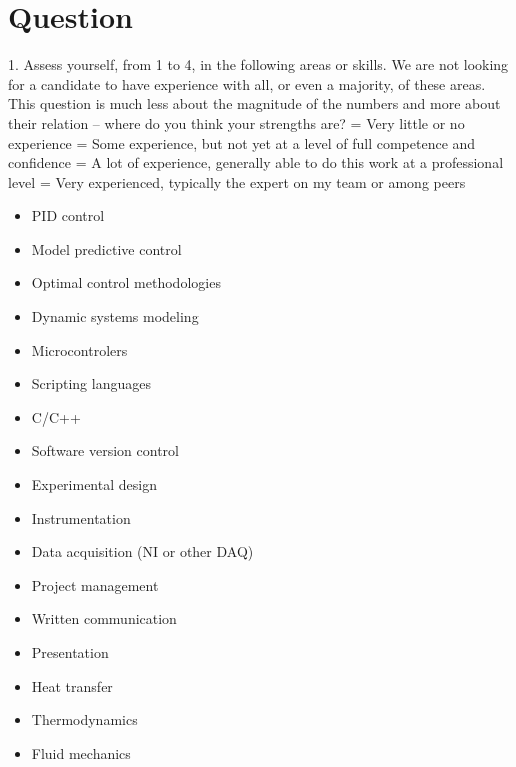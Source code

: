\section{Question}
1. Assess yourself, from 1 to 4, in the following areas or skills. We are not looking for a candidate to have experience with all, or even a majority, of these areas. This question is much less about the magnitude of the numbers and more about their relation – where do you think your strengths are?
\newline
{} = Very little or no experience
 = Some experience, but not yet at a level of full competence and confidence
 = A lot of experience, generally able to do this work at a professional level
 = Very experienced, typically the expert on my team or among peers
\newline
\begin{itemize}
    \item PID control
    \item Model predictive control
    \item Optimal control methodologies
    \item Dynamic systems modeling
    \item Microcontrolers
    \item Scripting languages
    \item C/C++
    \item Software version control
    \item Experimental design
    \item Instrumentation
    \item Data acquisition (NI or other DAQ)
    \item Project management
    \item Written communication
    \item Presentation
    \item Heat transfer
    \item Thermodynamics
    \item Fluid mechanics
\end{itemize}

